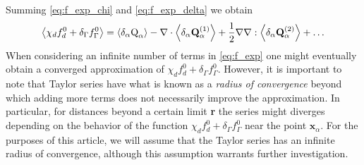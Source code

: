 Summing \ref{eq:f_exp_chi} and \ref{eq:f_exp_delta} we obtain
\begin{equation}
    \avg{\chi_df_d^0+\delta_\Gamma  f_\Gamma ^0} = \pavg{\text Q_\alpha}
    - \div  
    \pavg{\textbf{Q}_\alpha^{(1)}}        
    + \frac{1}{2} \grad\grad : \pavg{\textbf{Q}_{\alpha}^{(2)}}
    + \ldots  \label{eq:f_exp}
\end{equation}
When considering an infinite number of terms in \ref{eq:f_exp} one might eventually obtain a converged approximation of $\chi_d f_d^0+\delta_\Gamma  f_\Gamma ^0$. 
However, it is important to note that Taylor series have what is known as a \textit{radius of convergence} beyond which adding more terms does not necessarily improve the approximation\citep[Chapter 1]{appel2007}. 
In particular, for distances beyond a certain limit \textbf{r} the series might diverges depending on the behavior of the function $\chi_d f_d^0+\delta_\Gamma  f_\Gamma ^0$ near the point $\textbf{x}_\alpha$. 
For the purposes of this article, we will assume that the Taylor series has an infinite radius of convergence, although this assumption warrants further investigation.%


